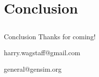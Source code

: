 \section{Conclusion}
\subsection{}

\begin{frame}{Conclusion}
	\centering
	Thanks for coming!
	
	\bigskip
	
	harry.wagstaff@gmail.com
	
	general@gensim.org
\end{frame}
